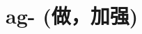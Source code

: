 \chapter{ag- (做，加强)}

\begin{vocabulary}[agenda]
\end{vocabulary}

\begin{vocabulary}[agency]
\end{vocabulary}

\begin{vocabulary}[agent]
\end{vocabulary}

\begin{vocabulary}[aggressor]
\end{vocabulary}